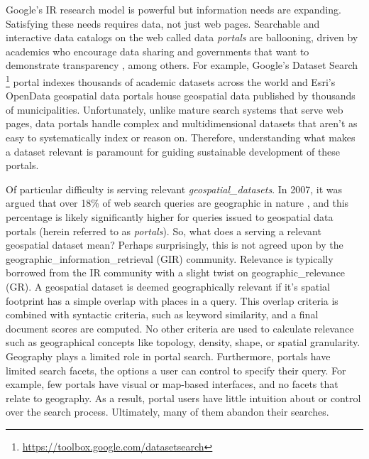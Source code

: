 Google’s IR research model is powerful but information needs are expanding. Satisfying these needs requires data, not just web pages. Searchable and interactive data catalogs on the web called data \emph{portals} are ballooning, driven by academics who encourage data sharing \cite{Lafia2016} and governments that want to demonstrate transparency \cite{Pereira2017}, among others. For example, Google’s Dataset Search \footnote{\url{https://toolbox.google.com/datasetsearch}} portal indexes thousands of academic datasets across the world and Esri's OpenData geospatial data portals house geospatial data published by thousands of municipalities. Unfortunately, unlike mature search systems that serve web pages, data portals handle complex and multidimensional datasets that aren't as easy to systematically index or reason on. Therefore, understanding what makes a dataset relevant is paramount for guiding sustainable development of these portals.

Of particular difficulty is serving relevant \emph{\gls{geospatial_datasets}}. In 2007, it was argued that over 18\% of web search queries are geographic in nature \cite{Sanderson2007}, and this percentage is likely significantly higher for queries issued to geospatial data portals (herein referred to as \emph{\gls{portals}}). So, what does a serving a relevant geospatial dataset mean? Perhaps surprisingly, this is not agreed upon by the \gls{geographic_information_retrieval} (\acrshort{GIR}) community. Relevance is typically borrowed from the IR community with a slight twist on \gls{geographic_relevance} (\acrshort{GR}). A geospatial dataset is deemed geographically relevant if it’s spatial footprint has a simple overlap with places in a query. This overlap criteria is combined with syntactic criteria, such as keyword similarity, and a final document scores are computed. No other criteria are used to calculate relevance such as geographical concepts like topology, density, shape, or spatial granularity. Geography plays a limited role in portal search. Furthermore, portals have limited search facets, the options a user can control to specify their query. For example, few portals have visual or map-based interfaces, and no facets that relate to geography. As a result, portal users have little intuition about or control over the search process. Ultimately, many of them abandon their searches.


